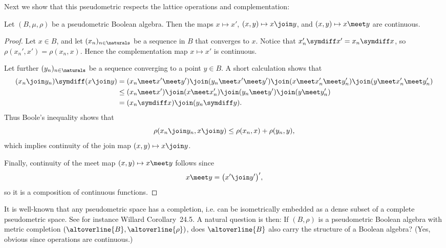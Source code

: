 \documentclass[article, a4paper, 11pt, oneside]{memoir}
\numberwithin{equation}{chapter}
\begin{document}
Next we show that this pseudometric respects the lattice operations and complementation:

\begin{proposition}
    Let $(B, \mu, \rho)$ be a pseudometric Boolean algebra. Then the maps $x \mapsto x'$, $(x,y) \mapsto x \join y$, and $(x,y) \mapsto x \meet y$ are continuous.
\end{proposition}

\begin{proof}
    Let $x \in B$, and let $(x_n)_{n\in\naturals}$ be a sequence in $B$ that converges to $x$. Notice that $x_n' \symdiff x' = x_n \symdiff x$, so $\rho(x_n',x') = \rho(x_n,x)$. Hence the complementation map $x \mapsto x'$ is continuous.

    Let further $(y_n)_{n\in\naturals}$ be a sequence converging to a point $y \in B$. A short calculation shows that
    \begin{align*}
        (x_n \join y_n) \symdiff (x \join y)
            &= (x_n \meet x' \meet y') \join
               (y_n \meet x' \meet y') \join
               (x \meet x_n' \meet y_n') \join
               (y \meet x_n' \meet y_n') \\
            &\leq (x_n \meet x') \join
            (x \meet x_n') \join
            (y_n \meet y') \join
            (y \meet y_n') \\
            &= (x_n \symdiff x) \join (y_n \symdiff y).
    \end{align*}
    Thus Boole's inequality shows that
    \begin{equation*}
        \rho(x_n \join y_n, x \join y)
            \leq \rho(x_n,x) + \rho(y_n,y),
    \end{equation*}
    which implies continuity of the join map $(x,y) \mapsto x \join y$.

    Finally, continuity of the meet map $(x,y) \mapsto x \meet y$ follows since
    \begin{equation*}
        x \meet y
            = \bigl( x' \join y' \bigr)',
    \end{equation*}
    so it is a composition of continuous functions.
\end{proof}

It is well-known that any pseudometric space has a completion, i.e. can be isometrically embedded as a dense subset of a complete pseudometric space. See for instance Willard Corollary~24.5. A natural question is then: If $(B,\rho)$ is a pseudometric Boolean algebra with metric completion $(\altoverline{B}, \altoverline{\rho})$, does $\altoverline{B}$ also carry the structure of a Boolean algebra? (Yes, obvious since operations are continuous.)
\end{document}
